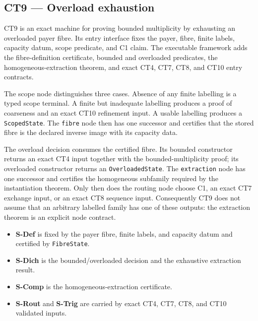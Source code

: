 \subsection{CT9 --- Overload exhaustion}\label{ct:9}\label{the-charging-principle-in-general-form}

CT9 is an exact machine for proving bounded multiplicity by exhausting an
overloaded payer fibre.  Its entry interface fixes the payer, fibre, finite
labels, capacity datum, scope predicate, and C1 claim.  The executable
framework adds the fibre-definition certificate, bounded and overloaded
predicates, the homogeneous-extraction theorem, and exact CT4, CT7, CT8, and
CT10 entry contracts.

The scope node distinguishes three cases.  Absence of any finite labelling is
a typed scope terminal.  A finite but inadequate labelling produces a proof of
coarseness and an exact CT10 refinement input.  A usable labelling produces a
\texttt{ScopedState}.  The \texttt{fibre} node then has one successor and
certifies that the stored fibre is the declared inverse image with its
capacity data.

The overload decision consumes the certified fibre.  Its bounded constructor
returns an exact CT4 input together with the bounded-multiplicity proof; its
overloaded constructor returns an \texttt{OverloadedState}.  The
\texttt{extraction} node has one successor and certifies the homogeneous
subfamily required by the instantiation theorem.  Only then does the routing
node choose C1, an exact CT7 exchange input, or an exact CT8 sequence input.
Consequently CT9 does not assume that an arbitrary labelled family has one of
these outputs: the extraction theorem is an explicit node contract.

\begin{itemize}
\tightlist
\item \textbf{S-Def} is fixed by the payer fibre, finite labels, and capacity datum and certified by \texttt{FibreState}.
\item \textbf{S-Dich} is the bounded/overloaded decision and the exhaustive extraction result.
\item \textbf{S-Comp} is the homogeneous-extraction certificate.
\item \textbf{S-Rout} and \textbf{S-Trig} are carried by exact CT4, CT7, CT8, and CT10 validated inputs.
\end{itemize}

